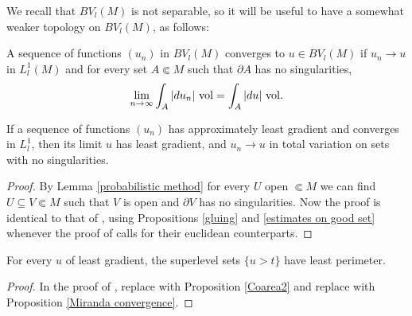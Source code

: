 We recall that $BV_l(M)$ is not separable, so it will be useful to have a somewhat weaker topology on $BV_l(M)$, as follows:

\begin{definition}
A sequence of functions $(u_n)$ in $BV_l(M)$ converges  to $u \in BV_l(M)$ if $u_n \to u$ in $L^1_l(M)$ and for every set $A \Subset M$ such that $\partial A$ has no singularities,
\begin{equation}\label{convergence in TV}
\lim_{n \to \infty} \int_A |du_n| ~\mathrm{vol} = \int_A |du| ~\mathrm{vol}.
\end{equation}
\end{definition}

\begin{proposition}\label{Miranda convergence}
If a sequence of functions $(u_n)$ has approximately least gradient and converges in $L^1_l$, then its limit $u$ has least gradient, and $u_n \to u$ in total variation on sets with no singularities.
\end{proposition}
\begin{proof}
By Lemma \ref{probabilistic method} for every $U$ open $\Subset M$ we can find $U \subseteq V \Subset M$ such that $V$ is open and $\partial V$ has no singularities.
Now the proof is identical to that of \cite[Teorema 3]{Miranda67}, using Propositions \ref{gluing} and \ref{estimates on good set} whenever the proof of \cite[Teorema 3]{Miranda67} calls for their euclidean counterparts.
\end{proof}

\begin{corollary}\label{level sets are minimal}
For every $u$ of least gradient, the superlevel sets $\{u > t\}$ have least perimeter.
\end{corollary}
\begin{proof}
In the proof of \cite[Theorem 1]{BOMBIERI1969}, replace \cite[Theorem 1.6]{Miranda66} with Proposition \ref{Coarea2} and replace \cite[Theorem 3]{Miranda67} with Proposition \ref{Miranda convergence}.
\end{proof}

